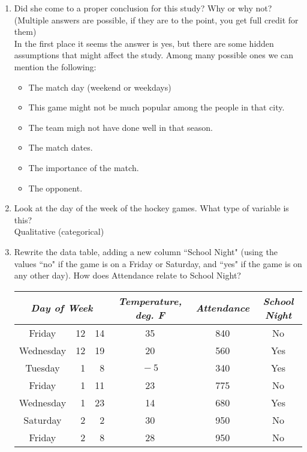\documentclass[11pt]{article}\usepackage[]{graphicx}\usepackage[]{color}
\newcommand{\ben}{\begin{enumerate}}
\newcommand{\een}{\end{enumerate}}
\begin{document}
\begin{itemize}
\ben
\addtocounter{enumii}{2}
\item Did she come to a proper conclusion for this study? Why or why not?\\
(Multiple answers are possible, if they are to the point, you get full credit for them)\\
In the first place it seems the answer is yes, but there are some hidden assumptions that might affect the study. Among many possible ones we can mention the following:\\
\begin{itemize}
\item The match day (weekend or weekdays)
\item This game might not be much popular among the people in that city.
\item The team migh not have done well in that season.
\item The match dates.
\item The importance of the match.
\item The opponent. 
\end{itemize}


\item Look at the day of the week of the hockey games.
What type of variable is this?\\
Qualitative (categorical)
 
\item 
Rewrite the data table, adding a new column ``School Night" (using the values ``no" if the game is on a Friday or Saturday, and ``yes" if the game is on any other day).
How does Attendance relate to School Night?
\hspace{1in}

\begin{tabular}{|cr@{/}r|c|c|c|} \hline
\multicolumn{3}{|c|}{\emph{Day of Week}} & \emph{Temperature, deg. F} & \emph{Attendance} & \emph{School Night}\\ \hline
Friday & 12&14 & 35 & 840 & No\\
Wednesday & 12&19 & 20 & 560& Yes \\
Tuesday & 1&8 & $\!-5$ & 340 & Yes\\
Friday & 1&11 & 23 & 775 & No\\
Wednesday & 1&23 & 14 & 680& Yes \\
Saturday & 2&2 & 30 & 950& No \\
Friday & 2&8 & 28 & 950 &No\\
\hline
\end{tabular}
\een


\end{itemize}
\end{document}
